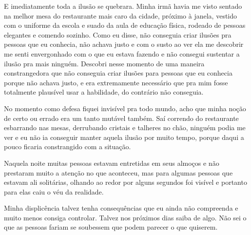 E imediatamente toda a ilusão se quebrara. Minha irmã havia me visto sentado na melhor mesa do restaurante mais caro da cidade, próximo à janela, vestido com o uniforme da escola e suado da aula de educação física, rodeado de pessoas elegantes e comendo sozinho. Como eu disse, não conseguia criar ilusões pra pessoas que eu conhecia, não achava justo e com o susto ao ver ela me descobrir me senti envergonhado com o que eu estava fazendo e não consegui sustentar a ilusão pra mais ninguém. Descobri nesse momento de uma maneira constrangedora que não conseguia criar ilusões para pessoas que eu conhecia porque não achava justo, e era extremamente necessário que pra mim fosse totalmente plausível usar a habilidade, do contrário não conseguia.

No momento como defesa fiquei invisível pra todo mundo, acho que minha noção de certo ou errado era um tanto mutável também. Saí correndo do restaurante esbarrando nas mesas, derrubando cristais e talheres no chão, ninguém podia me ver e eu não ia conseguir manter aquela ilusão por muito tempo, porque daqui a pouco ficaria constrangido com a situação.

Naquela noite muitas pessoas estavam entretidas em seus almoços e não prestaram muito a atenção no que aconteceu, mas para algumas pessoas que estavam ali solitárias, olhando ao redor por alguns segundos foi visível e portanto para elas caiu o véu da realidade.

Minha displicência talvez tenha consequências que eu ainda não compreenda e muito menos consiga controlar. Talvez nos próximos dias saiba de algo. Não sei o que as pessoas fariam se soubessem que podem parecer o que quiserem.



